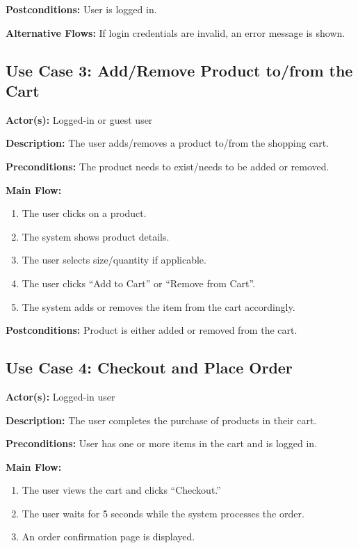 \documentclass[12pt]{article}
\begin{document}
	\textbf{Postconditions:} User is logged in.

	\textbf{Alternative Flows:} If login credentials are invalid, an error message is shown.

\subsection*{Use Case 3: Add/Remove Product to/from the Cart}

\textbf{Actor(s):} Logged-in or guest user

\textbf{Description:} The user adds/removes a product to/from the shopping cart.

\textbf{Preconditions:} The product needs to exist/needs to be added or removed.

\textbf{Main Flow:}
\begin{enumerate}
  	\item The user clicks on a product.
  	\item The system shows product details.
  	\item The user selects size/quantity if applicable.
	\item The user clicks ``Add to Cart'' or ``Remove from Cart''.
  	\item The system adds or removes the item from the cart accordingly.
\end{enumerate}

\textbf{Postconditions:} Product is either added or removed from the cart.

\subsection*{Use Case 4: Checkout and Place Order}

\textbf{Actor(s):} Logged-in user

\textbf{Description:} The user completes the purchase of products in their cart.

\textbf{Preconditions:} User has one or more items in the cart and is logged in.

\textbf{Main Flow:}
\begin{enumerate}
  	\item The user views the cart and clicks ``Checkout.''
  	\item The user waits for 5 seconds while the system processes the order.
  	\item An order confirmation page is displayed.
\end{enumerate}
\end{document}
